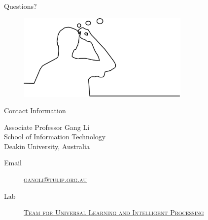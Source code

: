 \documentclass[
 size=14pt,
 paper=smartboard,  %
 mode=present, 		%
 display=slides, 	%
 style=tuliplab,  	%
 pauseslide,
 fleqn,leqno]{powerdot}{}
\begin{document}
%
\begin{slide}[toc=,bm=]{Questions?}
\begin{center}
\vspace{2cm}
\begin{figure}
    \includegraphics[width=0.75\textwidth]{figures//theme3//question.eps}
\end{figure}
\end{center}
\end{slide}


\begin{wideslide}[toc=,bm=]{Contact Information}
\centering
{}
\twocolumn[
lcolwidth=0.35\linewidth,
rcolwidth=0.65\linewidth
]
{
}
{
Associate Professor Gang Li\\
School of Information Technology\\
Deakin University, Australia
\begin{description}
 \item[Email] \href{mailto:gangli@tulip.org.au}
 {\textsc{\footnotesize{gangli@tulip.org.au}}}

 \item[Lab] \href{http://www.tulip.org.au}
 {\textsc{\footnotesize{Team for Universal Learning and Intelligent Processing}}}
\end{description}
}
\end{wideslide}
\end{document}
